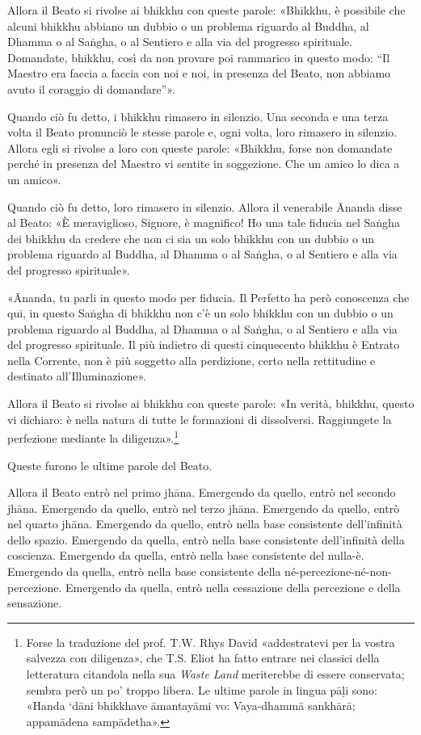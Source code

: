

Allora il Beato si rivolse ai bhikkhu con queste parole: «Bhikkhu, è
possibile che alcuni bhikkhu abbiano un dubbio o un problema riguardo al
Buddha, al Dhamma o al Saṅgha, o al Sentiero e alla via del progresso
spirituale. Domandate, bhikkhu, così da non provare poi rammarico in
questo modo: “Il Maestro era faccia a faccia con noi e noi, in presenza
del Beato, non abbiamo avuto il coraggio di domandare”».


Quando ciò fu detto, i bhikkhu rimasero in silenzio. Una seconda e una
terza volta il Beato pronunciò le stesse parole e, ogni volta, loro
rimasero in silenzio. Allora egli si rivolse a loro con queste parole:
«Bhikkhu, forse non domandate perché in presenza del Maestro vi sentite
in soggezione. Che un amico lo dica a un amico».


Quando ciò fu detto, loro rimasero in silenzio. Allora il venerabile
Ānanda disse al Beato: «È meraviglioso, Signore, è magnifico! Ho una
tale fiducia nel Saṅgha dei bhikkhu da credere che non ci sia un solo
bhikkhu con un dubbio o un problema riguardo al Buddha, al Dhamma o al
Saṅgha, o al Sentiero e alla via del progresso spirituale».


«Ānanda, tu parli in questo modo per fiducia. Il Perfetto ha però
conoscenza che qui, in questo Saṅgha di bhikkhu non c’è un solo bhikkhu
con un dubbio o un problema riguardo al Buddha, al Dhamma o al Saṅgha, o
al Sentiero e alla via del progresso spirituale. Il più indietro di
questi cinquecento bhikkhu è Entrato nella Corrente, non è più soggetto
alla perdizione, certo nella rettitudine e destinato all’Illuminazione».


Allora il Beato si rivolse ai bhikkhu con queste parole: «In verità,
bhikkhu, questo vi dichiaro: è nella natura di tutte le formazioni di
dissolversi. Raggiungete la perfezione mediante la
diligenza».\footnote{Forse la traduzione del prof. T.W. Rhys David «addestratevi per la vostra salvezza con diligenza», che T.S. Eliot ha fatto entrare nei classici della letteratura citandola nella sua \emph{Waste Land} meriterebbe di essere conservata; sembra però un po’ troppo libera. Le ultime parole in lingua pāḷi sono: «Handa ‘dāni bhikkhave āmantayāmi vo: Vaya-dhammā sankhārā; appamādena sampādetha».}




\label{pag364}Queste furono le ultime parole del Beato.


Allora il Beato entrò nel primo jhāna. Emergendo da quello, entrò nel
secondo jhāna. Emergendo da quello, entrò nel terzo jhāna. Emergendo da
quello, entrò nel quarto jhāna. Emergendo da quello, entrò nella base
consistente dell’infinità dello spazio. Emergendo da quella, entrò nella
base consistente dell’infinità della coscienza. Emergendo da quella,
entrò nella base consistente del nulla-è. Emergendo da quella, entrò
nella base consistente della né-percezione-né-non-percezione. Emergendo
da quella, entrò nella cessazione della percezione e della sensazione.


